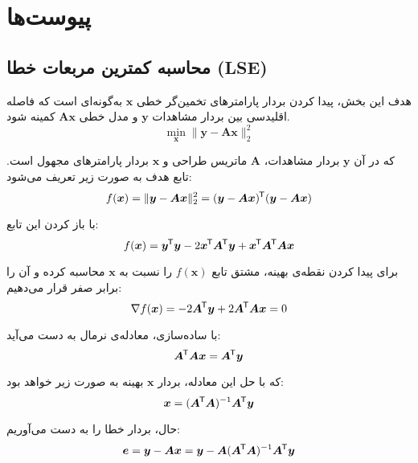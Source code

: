 \documentclass[12pt,onecolumn,a4paper]{article}
\newcommand*{\transpose}{{\mkern-1.5mu\mathsf{T}}}
\begin{document}
\newpage
\section{پیوست‌ها}


\subsection{محاسبه کمترین مربعات خطا (LSE)}



هدف این بخش، پیدا کردن بردار پارامترهای تخمین‌گر خطی \( \bm{x} \) به‌گونه‌ای است که فاصله اقلیدسی بین بردار مشاهدات \( \bm{y} \) و مدل خطی \( \bm{A} \bm{x} \) کمینه شود.
\begin{equation}
	\min_{\bm{x}} \| \bm{y} - \bm{A} \bm{x} \|_2^2
\end{equation}

که در آن \( \bm{y} \) بردار مشاهدات، \( \bm{A} \) ماتریس طراحی و \( \bm{x} \) بردار پارامترهای مجهول است. تابع هدف به صورت زیر تعریف می‌شود:
\begin{equation}
	f(\bm{x}) = \| \bm{y} - \bm{A} \bm{x} \|_2^2 = (\bm{y} - \bm{A} \bm{x})^\transpose (\bm{y} - \bm{A} \bm{x})
\end{equation}

با باز کردن این تابع:
\begin{equation}
	f(\bm{x}) = \bm{y}^\transpose \bm{y} - 2 \bm{x}^\transpose \bm{A}^\transpose \bm{y} + \bm{x}^\transpose \bm{A}^\transpose \bm{A} \bm{x}
\end{equation}

برای پیدا کردن نقطه‌ی بهینه، مشتق تابع \( f(\bm{x}) \) را نسبت به \( \bm{x} \) محاسبه کرده و آن را برابر صفر قرار می‌دهیم:
\begin{equation}
	{\nabla} f(\bm{x}) = -2 \bm{A}^\transpose \bm{y} + 2 \bm{A}^\transpose \bm{A} \bm{x} = 0
\end{equation}

با ساده‌سازی، معادله‌ی نرمال به دست می‌آید:
\begin{equation}
	\bm{A}^\transpose \bm{A} \bm{x} = \bm{A}^\transpose \bm{y}
\end{equation}

که با حل این معادله، بردار \( \bm{x} \) بهینه به صورت زیر خواهد بود:
\begin{equation}
	\bm{x} = (\bm{A}^\transpose \bm{A})^{-1} \bm{A}^\transpose \bm{y}
\end{equation}

حال، بردار خطا را به دست می‌آوریم:
\begin{equation}
	\bm{e} = \bm{y} - \bm{A} \bm{x} = \bm{y} - \bm{A} (\bm{A}^\transpose \bm{A})^{-1} \bm{A}^\transpose \bm{y}
\end{equation}
\end{document}
